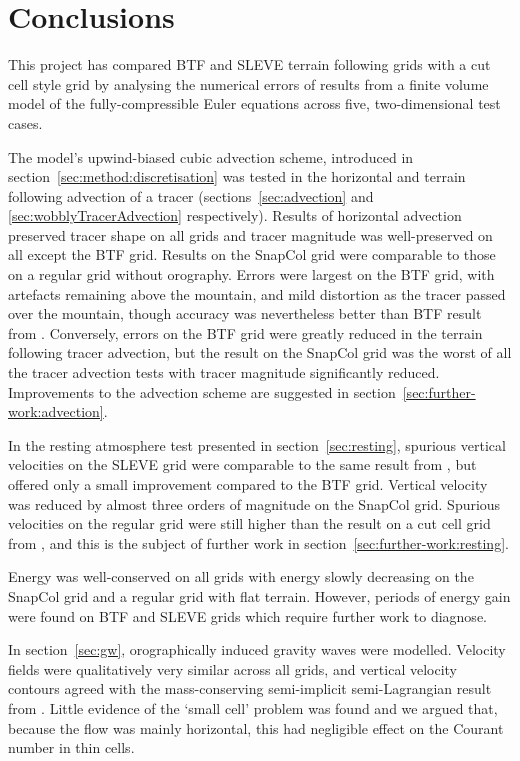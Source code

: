 \chapter{Conclusions}
\label{sec:conclusions}

This project has compared BTF and SLEVE terrain following grids with a cut cell style grid by analysing the numerical errors of results from a finite volume model of the fully-compressible Euler equations across five, two-dimensional test cases.

The model's upwind-biased cubic advection scheme, introduced in section~\ref{sec:method:discretisation} was tested in the horizontal and terrain following advection of a tracer (sections~\ref{sec:advection} and \ref{sec:wobblyTracerAdvection} respectively).  Results of horizontal advection preserved tracer shape on all grids and tracer magnitude was well-preserved on all except the BTF grid.  Results on the SnapCol grid were comparable to those on a regular grid without orography.  Errors were largest on the BTF grid, with artefacts remaining above the mountain, and mild distortion as the tracer passed over the mountain, though accuracy was nevertheless better than BTF result from \textcite{schaer2002}.  Conversely, errors on the BTF grid were greatly reduced in the terrain following tracer advection, but the result on the SnapCol grid was the worst of all the tracer advection tests with tracer magnitude significantly reduced.  Improvements to the advection scheme are suggested in section~\ref{sec:further-work:advection}.

In the resting atmosphere test presented in section~\ref{sec:resting}, spurious vertical velocities on the SLEVE grid were comparable to the same result from \textcite{schaer2002}, but offered only a small improvement compared to the BTF grid.  Vertical velocity was reduced by almost three orders of magnitude on the SnapCol grid.  Spurious velocities on the regular grid were still higher than the result on a cut cell grid from \textcite{good2013}, and this is the subject of further work in section~\ref{sec:further-work:resting}.

Energy was well-conserved on all grids with energy slowly decreasing on the SnapCol grid and a regular grid with flat terrain.  However, periods of energy gain were found on BTF and SLEVE grids which require further work to diagnose.

In section~\ref{sec:gw}, orographically induced gravity waves were modelled.  Velocity fields were qualitatively very similar across all grids, and vertical velocity contours agreed with the mass-conserving semi-implicit semi-Lagrangian result from \textcite{melvin2010}.  Little evidence of the `small cell' problem was found and we argued that, because the flow was mainly horizontal, this had negligible effect on the Courant number in thin cells.

